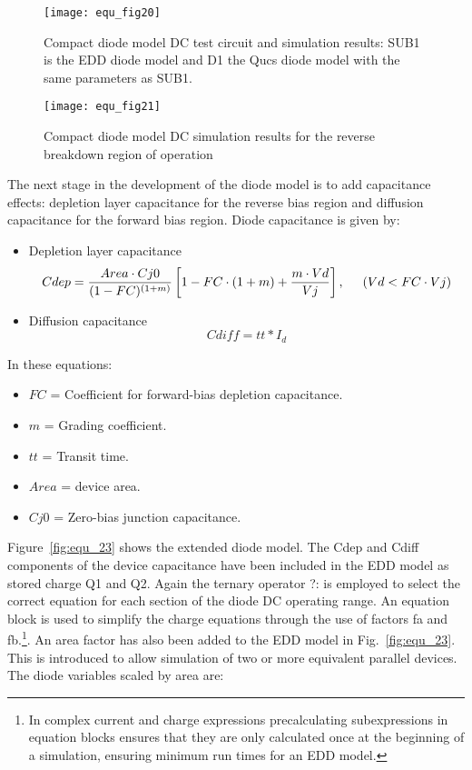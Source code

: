 \begin{figure} 
  \centering
  \texttt{[image: equ\_fig20]}
  \caption{Compact diode model DC test circuit and simulation results: SUB1 is the EDD diode model and D1 the Qucs diode model with the same parameters as SUB1. } 
  \label{fig:equ_20}
\end{figure} 


\begin{figure} 
  \centering
  \texttt{[image: equ\_fig21]}
  \caption{Compact diode model DC simulation results for the reverse breakdown region of operation } 
  \label{fig:equ_21}
\end{figure} 

\vspace{3mm}

The next stage in the development of the diode model is to add
capacitance effects: depletion layer capacitance for the reverse bias
region and diffusion capacitance for the forward bias region. Diode
capacitance is given by:

\begin{itemize}
 \item Depletion layer capacitance
\begin{equation}
 Cdep = \dfrac{Area \cdot Cj0}{(1-FC)^{(1+m)}}\left[ 1-FC \cdot (1+m)+\dfrac{m \cdot Vd}{Vj} \right], \hspace{5mm} (Vd < FC \cdot Vj)  
\end{equation}
\item Diffusion capacitance
\begin{equation}
 Cdiff=tt*I_{d}
\end{equation} 
\end{itemize}

In these equations:
\begin{itemize}
 \item  $FC$ = Coefficient for forward-bias depletion capacitance.
 \item  $m $ = Grading coefficient.
 \item  $tt$ = Transit time.
 \item  $Area$ = device area.
 \item  $Cj0$ = Zero-bias junction capacitance.
\end{itemize}

Figure~\ref{fig:equ_23} shows the extended diode model. The Cdep and
Cdiff components of the device capacitance have been included in the
EDD model as stored charge Q1 and Q2. Again the ternary operator ?: is
employed to select the correct equation for each section of the diode
DC operating range. An equation block is used to simplify the charge
equations through the use of factors fa and fb.\footnote{In complex
current and charge expressions precalculating subexpressions in
equation blocks ensures that they are only calculated once at the
beginning of a simulation, ensuring minimum run times for an EDD
model.}. An area factor has also been added to the EDD model in
Fig.~\ref{fig:equ_23}. This is introduced to allow simulation of two
or more equivalent parallel devices. The diode variables scaled by
area are:

